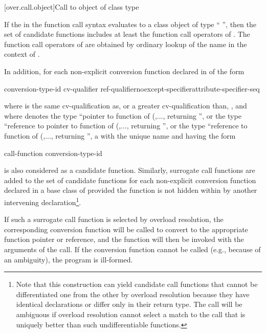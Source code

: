 [over.call.object]{Call to object of class type}

\pnum
If the
in the function call syntax evaluates
to a class object of type ``\cv{}
'',
then the set of candidate
functions includes at least the function call operators of
.
The
function call operators of
are obtained by ordinary lookup of
the name
in the context of
.

\pnum
In addition, for each non-explicit conversion function declared in  of the
form

\begin{ncsimplebnf}
 conversion-type-id \terminal{(\,)} cv-qualifier ref-qualifier\opt noexcept-specifier\opt attribute-specifier-seq\opt{} \terminal{;}
\end{ncsimplebnf}

where
is the same cv-qualification as, or a greater cv-qualification than,
\cv{},
and where
denotes the type ``pointer to function
of (,..., returning '',
or the type ``reference to pointer to function
of (,..., returning '',
or the type
``reference to function of (,...,
returning '', a  with the unique name
and having the form

\begin{ncbnf}
 call-function \terminal{(} conversion-type-id  
\end{ncbnf}

is also considered as a candidate function.
Similarly, surrogate
call functions are added to the set of candidate functions for
each non-explicit conversion function declared in a base class of
provided the function is not hidden within
by another
intervening declaration\footnote{Note that this construction can yield
candidate call functions that cannot be
differentiated one from the other by overload resolution because they have
identical
declarations or differ only in their return type.
The call will be ambiguous
if overload
resolution cannot select a match to the call that is uniquely better than such
undifferentiable functions.}.

\pnum
If such a surrogate call function is selected by overload
resolution, the corresponding conversion function will be called to convert
to the appropriate function pointer or reference, and the function
will then be invoked with the arguments of the call. If the
conversion function cannot be called (e.g., because of an ambiguity),
the program is ill-formed.

